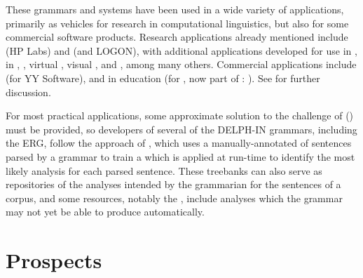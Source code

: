 \documentclass[output=paper
 	        ,biblatex
                ,babelshorthands
                ,newtxmath
                ,draftmode
                ,colorlinks, citecolor=brown
]{langscibook}
\begin{document}
These grammars and systems have been used in a wide variety of applications, primarily as vehicles for research in computational linguistics, but also for some commercial software products.  Research applications already mentioned include  (HP Labs) and  (\verbmobil and LOGON), with additional applications developed for use in  \citep*{Sch:Kie:Spu:11},  in  \citep*{Hellanetal:13},  \citep{Herb:Cope:06}, virtual  \citep{packard2014uw}, visual  \citep{DBLP:journals/corr/KuhnleC17}, and  \citep{Flickinger:17}, among many others.  Commercial applications include  (for YY Software), and  in education (for , now part of : \citealt*{Suppesetal:12}).  See  for further discussion.

For most practical applications, some approximate solution to the challenge of  () must be provided, so developers of several of the DELPH-IN grammars, including the ERG, follow the approach of \citet*{OFTM2004a-u}, which uses a manually-annotated  of sentences parsed by a grammar to train a  which is applied at run-time to identify the most likely analysis for each parsed sentence.  These treebanks can also serve as repositories of the analyses intended by the grammarian for the sentences of a corpus, and some resources, notably the  \citep*{BvNM2001a-u}, include analyses which the grammar may not yet be able to produce automatically.  

\section{Prospects}
\end{document}
